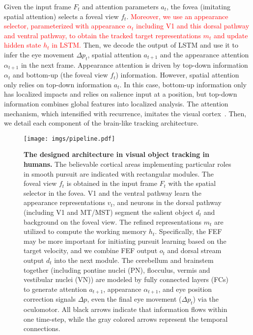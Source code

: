 \documentclass[final,3p,times,twocolumn]{elsarticle}
\begin{document}
Given the input frame $F_t$ and attention parameters $a_t$, the fovea (imitating spatial attention) selects a foveal view $f_t$. 
\textcolor{red}{Moreover, we use an appearance selector, parameterized with appearance $\alpha _t$ including V1 and this dorsal pathway and ventral pathway, to obtain the tracked target representations $m_t$ 
and update hidden state $h_t$ in LSTM.}
Then, we decode the output of LSTM and use it to infer the eye movement $\Delta p_t$, spatial attention $a_{t+1}$ and the appearance attention $\alpha _{t+1}$ in the next frame.  
Appearance attention is driven by top-down information $\alpha _t$ and bottom-up (the foveal view $f_t$) information. 
However, spatial attention only relies on top-down information $a_t$.
In this case, bottom-up information only has localized impacts and relies on salience input at a position, 
but top-down information combines global features into localized analysis. 
The attention mechanism, which intensified with recurrence, imitates the visual cortex~\cite{attention}.
Then, we detail each component of the brain-like tracking architecture. 


\begin{figure*}
	\centering
	\texttt{[image: imgs/pipeline.pdf]}
	\caption{
		\textbf{
			The designed architecture in visual object tracking in humans.} 
		The believable cortical areas implementing particular roles in smooth pursuit are indicated with rectangular modules.
		The foveal view $f_t$ is obtained in the input frame $F_t$ with the spatial selector in the fovea. 
		V1 and the ventral pathway learn the appearance representations $v_t$, 
		and neurons in the dorsal pathway (including V1 and MT/MST) segment the salient object $d_t$ and background on the foveal view.
		The refined representations $m_t$ are utilized to compute the working memory $h_t$.
		Specifically, the FEF may be more important for initiating pursuit learning based on the target velocity,
		and we combine FEF output $o_t$ and dorsal stream output $d_t$ into the next module. 
		The cerebellum and brainstem together (including pontine nuclei (PN), flocculus, vermis and vestibular nuclei (VN)) are modeled by fully connected layers (FCs) to generate attention $a_{t+1}$, appearance $\alpha_{t+1}$, and eye position correction signals $\Delta p$,
		even the final eye movement ($\Delta p_t$) via the oculomotor.
		All black arrows indicate that information flows within one time-step, 
		while the gray colored arrows represent the temporal connections.  
	}
	\label{fig:pipeline}
\end{figure*}
\end{document}
